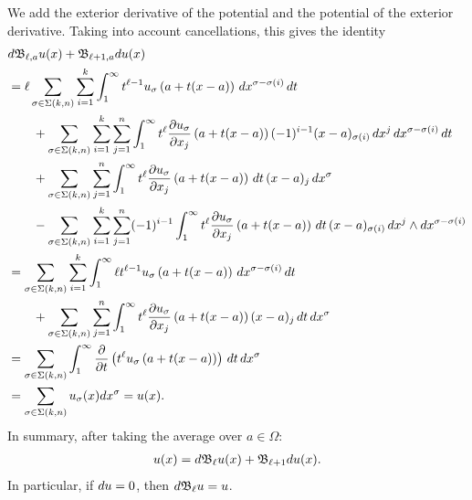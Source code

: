 \documentclass[10pt,letterpaper]{article}
\begin{document}
We add the exterior derivative of the potential and the potential of the exterior derivative.
Taking into account cancellations, this gives the identity 
\begin{align*}
    &
    d {\mathfrak B}_{\ell,a} u(x)
    +
    {\mathfrak B}_{\ell+1,a} d u(x)
    \\&
    =
    \ell
    \sum_{\sigma \in \Sigma(k,n)} \sum_{i=1}^{k}
    \int_{1}^\infty 
    t^{\ell-1} u_{\sigma}\left(a+t(x-a)\right) \,dx^{\sigma-\sigma(i)} \,dt 
    \\&\qquad
    + 
    \sum_{\sigma \in \Sigma(k,n)} \sum_{i=1}^{k} \sum_{j=1}^{n}
    \int_{1}^\infty 
    t^{\ell} \frac{ \partial u_{\sigma} }{\partial x_{j}}\left(a+t(x-a)\right) (-1)^{i-1} (x-a)_{\sigma(i) } \,dx^{j} \,dx^{\sigma-\sigma(i)} \,dt 
    \\&\qquad
    +
    \sum_{\sigma \in \Sigma(k,n)} \sum_{j=1}^{n}
    \int_{1}^\infty t^{\ell} \frac{ \partial u_{\sigma} }{\partial x_{j}}\left(a+t(x-a)\right) \,dt \,(x-a)_{j} \,dx^{\sigma}
    \\&\qquad
    - 
    \sum_{\sigma \in \Sigma(k,n)} \sum_{i=1}^{k} \sum_{j=1}^{n}
    (-1)^{i-1}
    \int_{1}^\infty t^{\ell} \frac{ \partial u_{\sigma} }{\partial x_{j}}\left(a+t(x-a)\right) \,dt 
    \,(x-a)_{\sigma(i)} \,dx^{j} \wedge dx^{\sigma-\sigma(i)}
    \\&
    =
    \sum_{\sigma \in \Sigma(k,n)} \sum_{i=1}^{k}
    \int_{1}^\infty 
    \ell t^{\ell-1} u_{\sigma}\left(a+t(x-a)\right) \,dx^{\sigma-\sigma(i)} \,dt 
    \\&\qquad
    +
    \sum_{\sigma \in \Sigma(k,n)} \sum_{j=1}^{n}
    \int_{1}^\infty t^{\ell} \frac{ \partial u_{\sigma} }{\partial x_{j}}\left(a+t(x-a)\right) (x-a)_{j} \,dt \,dx^{\sigma}
    \\&
    =
    \sum_{\sigma \in \Sigma(k,n)} 
    \int_{1}^\infty \frac{\partial}{\partial t} \left( t^{\ell} u_{\sigma}\left(a+t(x-a)\right) \right) \,dt \,dx^{\sigma}
    \\&
    =
    \sum_{\sigma \in \Sigma(k,n)} 
    u_{\sigma}(x) dx^{\sigma}
    =
    u(x)
    .
\end{align*}
In summary, after taking the average over $a \in \Omega$:
\begin{align*}
    u(x) = d {\mathfrak B}_{\ell} u(x) + {\mathfrak B}_{\ell+1} d u(x)
    .
\end{align*}
In particular, if $d u = 0$, then $d {\mathfrak B}_{\ell} u = u$.
\\
\end{document}
